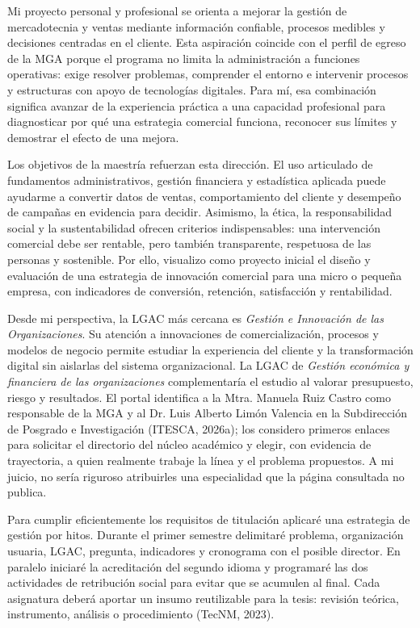 \documentclass[spanish,letterpaper,oneside]{article}
\begin{document}
Mi proyecto personal y profesional se orienta a mejorar la gestión de mercadotecnia y ventas mediante información confiable, procesos medibles y decisiones centradas en el cliente. Esta aspiración coincide con el perfil de egreso de la MGA porque el programa no limita la administración a funciones operativas: exige resolver problemas, comprender el entorno e intervenir procesos y estructuras con apoyo de tecnologías digitales. Para mí, esa combinación significa avanzar de la experiencia práctica a una capacidad profesional para diagnosticar por qué una estrategia comercial funciona, reconocer sus límites y demostrar el efecto de una mejora.

Los objetivos de la maestría refuerzan esta dirección. El uso articulado de fundamentos administrativos, gestión financiera y estadística aplicada puede ayudarme a convertir datos de ventas, comportamiento del cliente y desempeño de campañas en evidencia para decidir. Asimismo, la ética, la responsabilidad social y la sustentabilidad ofrecen criterios indispensables: una intervención comercial debe ser rentable, pero también transparente, respetuosa de las personas y sostenible. Por ello, visualizo como proyecto inicial el diseño y evaluación de una estrategia de innovación comercial para una micro o pequeña empresa, con indicadores de conversión, retención, satisfacción y rentabilidad.

Desde mi perspectiva, la LGAC más cercana es \emph{Gestión e Innovación de las Organizaciones}. Su atención a innovaciones de comercialización, procesos y modelos de negocio permite estudiar la experiencia del cliente y la transformación digital sin aislarlas del sistema organizacional. La LGAC de \emph{Gestión económica y financiera de las organizaciones} complementaría el estudio al valorar presupuesto, riesgo y resultados. El portal identifica a la Mtra. Manuela Ruiz Castro como responsable de la MGA y al Dr. Luis Alberto Limón Valencia en la Subdirección de Posgrado e Investigación (ITESCA, 2026a); los considero primeros enlaces para solicitar el directorio del núcleo académico y elegir, con evidencia de trayectoria, a quien realmente trabaje la línea y el problema propuestos. A mi juicio, no sería riguroso atribuirles una especialidad que la página consultada no publica.

Para cumplir eficientemente los requisitos de titulación aplicaré una estrategia de gestión por hitos. Durante el primer semestre delimitaré problema, organización usuaria, LGAC, pregunta, indicadores y cronograma con el posible director. En paralelo iniciaré la acreditación del segundo idioma y programaré las dos actividades de retribución social para evitar que se acumulen al final. Cada asignatura deberá aportar un insumo reutilizable para la tesis: revisión teórica, instrumento, análisis o procedimiento (TecNM, 2023).
\end{document}
